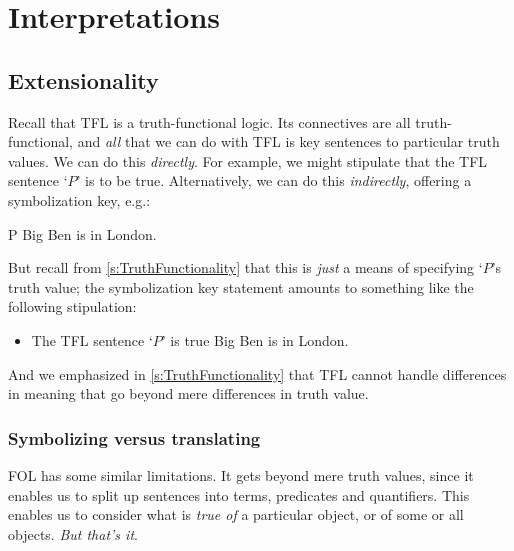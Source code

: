 \part{Interpretations}
\label{ch.semantics}


\chapter{Extensionality}\label{s:Interpretations}

Recall that TFL is a truth-functional logic. Its connectives are all truth-functional, and \emph{all} that we can do with TFL is key sentences to particular truth values. We can do this \emph{directly}. For example, we might stipulate that the TFL sentence `$P$' is to be true. Alternatively, we can do this \emph{indirectly}, offering a symbolization key, e.g.:
	\begin{ekey}
		\item[P] Big Ben is in London.
	\end{ekey}
 But recall from \cref{s:TruthFunctionality} that this is \emph{just} a means of specifying `$P$'s truth value; the symbolization key statement amounts to something like the following stipulation: 
	\begin{itemize}
		\item The TFL sentence `$P$' is true \ifeff{} Big Ben is in London.
	\end{itemize}
And we emphasized in \cref{s:TruthFunctionality} that TFL cannot handle differences in meaning that go beyond mere differences in truth value.

\section{Symbolizing versus translating}

FOL has some similar limitations. It gets beyond mere truth values,
since it enables us to split up sentences into terms, predicates and
quantifiers. This enables us to consider what is \emph{true of} a
particular object, or of some or all objects. \emph{But that's it}.

